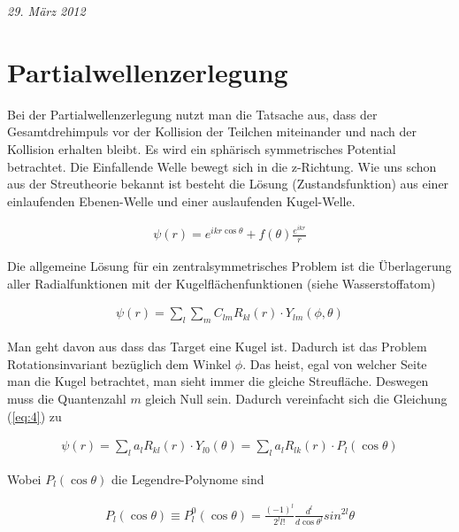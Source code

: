 
\usepackage{amsmath}                %
\usepackage{amsfonts}



\textit{29. März 2012}


\section*{Partialwellenzerlegung}

Bei der Partialwellenzerlegung nutzt man die Tatsache aus, dass der Gesamtdrehimpuls vor der Kollision der Teilchen miteinander und nach der Kollision erhalten bleibt. Es wird ein sphärisch symmetrisches Potential betrachtet. Die Einfallende Welle bewegt sich in die z-Richtung. Wie uns schon aus der Streutheorie bekannt ist besteht die Lösung (Zustandsfunktion) aus einer einlaufenden Ebenen-Welle und einer auslaufenden Kugel-Welle. 

\begin{align}
  \label{eq:1}
  \psi(r) = e^{ikr\cos\theta} + f(\theta)\frac{e^{i k r}}{r}
\end{align}

Die allgemeine Lösung für ein zentralsymmetrisches Problem ist die Überlagerung aller Radialfunktionen mit der Kugelflächenfunktionen (siehe Wasserstoffatom)

\begin{align}
  \label{eq:4}
  \psi(r) = \sum_l\sum_m C_{lm} R_{kl}(r)\cdot Y_{lm}(\phi,\theta) 
\end{align}

Man geht davon aus dass das Target eine Kugel ist. Dadurch ist das Problem Rotationsinvariant bezüglich dem Winkel \(\phi\). Das heist, egal von welcher Seite man die Kugel betrachtet, man sieht immer die gleiche Streufläche. Deswegen muss die Quantenzahl \(m\) gleich Null sein. Dadurch vereinfacht sich die Gleichung (\ref{eq:4}) zu

\begin{align}
  \label{eq:5}
    \psi(r) = \sum_l a_{l} R_{kl}(r)\cdot Y_{l0}(\theta) = \sum_l a_{l} R_{lk}(r)\cdot P_{l}(\cos\theta)
\end{align}

Wobei \(P_{l}(\cos\theta)\) die Legendre-Polynome sind

\begin{align}
  \label{eq:6}
  P_{l}(\cos\theta) \equiv P_{l}^0(\cos\theta) = \frac{(-1)^l}{2^l l!}\frac{d^l}{d \cos\theta^l}sin^{2l}\theta
\end{align}

